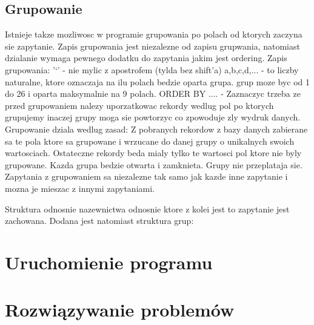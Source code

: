 \subsection{Grupowanie}
Istnieje takze mozliwosc w programie grupowania po polach od ktorych zaczyna sie zapytanie. Zapis grupowania jest niezalezne od zapisu grupwania, natomiast dzialanie wymaga pewnego dodatku do zapytania jakim jest ordering.
Zapis grupowania:
'`' - nie mylic z apostrofem (tylda bez shift'a)
a,b,c,d,... - to liczby naturalne, ktore oznaczaja na ilu polach bedzie oparta grupa. grup moze byc od 1 do 26 i oparta maksymalnie na 9 polach.
ORDER BY .... - Zaznaczyc trzeba ze przed grupowaniem nalezy uporzatkowac rekordy wedlug pol po ktorych grupujemy inaczej grupy moga sie powtorzyc co zpowoduje zly wydruk danych.
Grupowanie dziala wedlug zasad:
Z pobranych rekordow z bazy danych zabierane sa te pola ktore sa grupowane i wrzucane do danej grupy o unikalnych swoich wartosciach. 
Ostateczne rekordy beda mialy tylko te wartosci pol ktore nie byly grupowane.
Kazda grupa bedzie otwarta i zamknieta.
Grupy nie przeplataja sie.
Zapytania z grupowaniem sa niezalezne tak samo jak kazde inne zapytanie i mozna je mieszac z innymi zapytaniami.

Struktura odnosnie nazewnictwa odnosnie ktore z kolei jest to zapytanie jest zachowana. Dodana jest natomiast struktura grup:
\section{Uruchomienie programu}
\section{Rozwiązywanie problemów}
